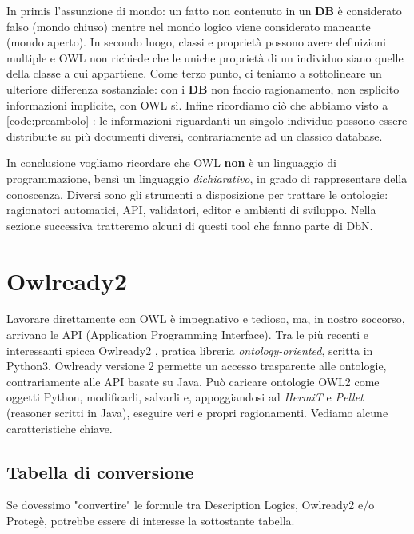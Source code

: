 In primis l'assunzione di mondo: un fatto non contenuto in un \textbf{DB} è considerato falso (mondo chiuso) mentre nel mondo
logico viene considerato mancante (mondo aperto). In secondo luogo, classi e proprietà possono avere definizioni multiple e OWL non richiede che le uniche proprietà di un individuo siano quelle della classe a cui appartiene.
Come terzo punto, ci teniamo a sottolineare un ulteriore differenza sostanziale: con i \textbf{DB} non faccio ragionamento, non esplicito informazioni implicite, con OWL sì.
Infine ricordiamo ciò che abbiamo visto a \ref{code:preambolo} : le informazioni riguardanti un singolo individuo 
possono essere distribuite su più documenti diversi, contrariamente ad un classico database.

In conclusione vogliamo ricordare che OWL \textbf{non} è un linguaggio di programmazione, bensì
un linguaggio \textit{dichiarativo}, in grado di rappresentare della conoscenza. Diversi sono gli strumenti
a disposizione per trattare le ontologie: ragionatori automatici, API, validatori, editor e ambienti di sviluppo.
Nella sezione successiva tratteremo alcuni di questi tool che fanno parte di DbN.  

\section{Owlready2} \label{sec: OwlR2}
Lavorare direttamente con OWL è impegnativo e tedioso, ma, in nostro soccorso, arrivano le API (Application Programming Interface).
Tra le più recenti e interessanti spicca Owlready2 \cite{OwlReady}, pratica libreria \textit{ontology-oriented}, scritta in Python3. Owlready versione 2 permette un accesso trasparente alle ontologie, contrariamente alle API basate su Java.
Può caricare ontologie OWL2 come oggetti Python, modificarli, salvarli e, appoggiandosi ad  \textit{HermiT} e \textit{Pellet} (reasoner scritti in Java), eseguire veri e propri ragionamenti.
Vediamo alcune caratteristiche chiave.

\subsection{Tabella di conversione}
Se dovessimo "convertire" le formule tra Description Logics, Owlready2 e/o Protegè,
potrebbe essere di interesse la sottostante tabella.

